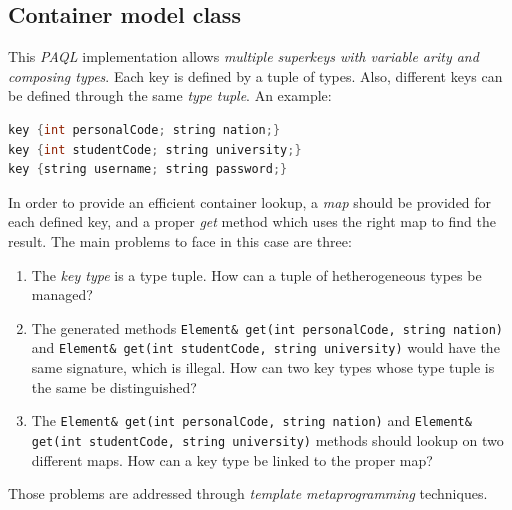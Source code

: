\documentclass[10pt]{article}  %
\begin{document}
    \subsection{Container model class}
        This \emph{PAQL} implementation allows \emph{multiple superkeys with variable arity and composing types}.
        Each key is defined by a tuple of types. Also, different keys can be defined through the same \emph{type tuple}. An example:
        \begin{lstlisting}[language=C++]
key {int personalCode; string nation;}
key {int studentCode; string university;}
key {string username; string password;}
        \end{lstlisting}

        In order to provide an efficient container lookup, a \emph{map} should be provided
        for each defined key, and a proper \emph{get} method which uses the right map to find the result.
        The main problems to face in this case are three:
        \begin{enumerate}
            \item The \emph{key type} is a type tuple. How can a tuple of hetherogeneous types be managed?
            \item The generated methods \texttt{Element\& get(int personalCode, string nation)} and
            \texttt{Element\& get(int studentCode, string university)}
                would have the same signature, which is illegal. How can two key types whose type tuple is the same be distinguished?
            \item The \texttt{Element\& get(int personalCode, string nation)} and
            \texttt{Element\& get(int studentCode, string university)} methods should
            lookup on two different maps. How can a key type be linked to the proper map?
        \end{enumerate}
        Those problems are addressed through \emph{template metaprogramming} techniques.
\end{document}
